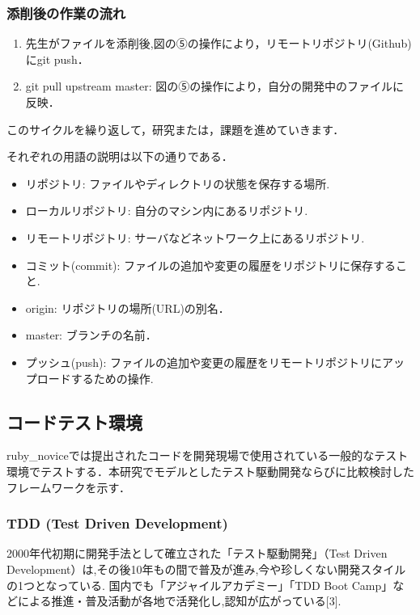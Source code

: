 \subsubsection{添削後の作業の流れ}
\begin{enumerate}
\item 先生がファイルを添削後,図の⑤の操作により，リモートリポジトリ(Github)にgit push．
\item git pull upstream master: 図の⑤の操作により，自分の開発中のファイルに反映．
\end{enumerate}
このサイクルを繰り返して，研究または，課題を進めていきます．

それぞれの用語の説明は以下の通りである．

\begin{itemize}
\item リポジトリ:          ファイルやディレクトリの状態を保存する場所.
\item ローカルリポジトリ:  自分のマシン内にあるリポジトリ.
\item リモートリポジトリ:  サーバなどネットワーク上にあるリポジトリ.
\item コミット(commit):    ファイルの追加や変更の履歴をリポジトリに保存すること.
\item origin:              リポジトリの場所(URL)の別名．
\item master:              ブランチの名前．
\item プッシュ(push):      ファイルの追加や変更の履歴をリモートリポジトリにアップロードするための操作.
\end{itemize}
\subsection{コードテスト環境}
ruby\_noviceでは提出されたコードを開発現場で使用されている一般的なテスト環境でテストする．本研究でモデルとしたテスト駆動開発ならびに比較検討したフレームワークを示す．

\subsubsection{TDD (Test Driven Development)}
2000年代初期に開発手法として確立された「テスト駆動開発」（Test Driven Development）は,その後10年もの間で普及が進み,今や珍しくない開発スタイルの1つとなっている.
国内でも「アジャイルアカデミー」「TDD Boot Camp」などによる推進・普及活動が各地で活発化し,認知が広がっている[3].


